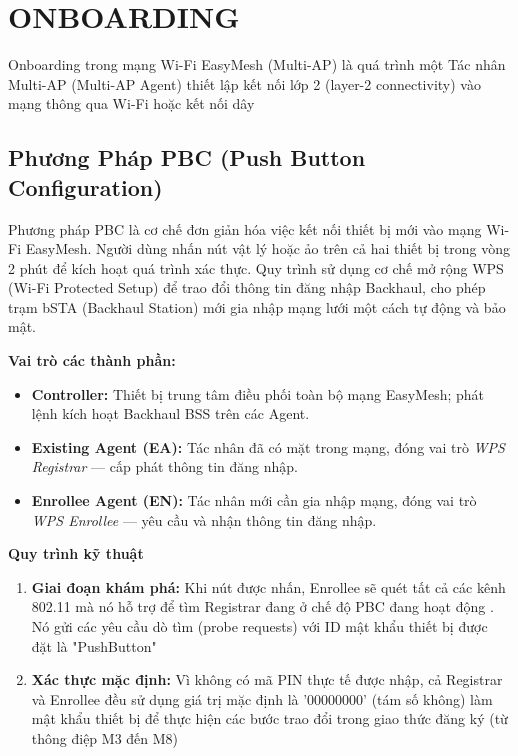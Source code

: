 \chapter{ONBOARDING}
\label{chapter:chapter-3}

Onboarding trong mạng Wi-Fi EasyMesh (Multi-AP) là quá trình một Tác nhân Multi-AP (Multi-AP Agent) thiết lập kết nối lớp 2 (layer-2 connectivity) vào mạng thông qua Wi-Fi hoặc kết nối dây

\section{Phương Pháp PBC (Push Button Configuration)}

Phương pháp PBC là cơ chế đơn giản hóa việc kết nối thiết bị mới vào mạng Wi-Fi EasyMesh.
Người dùng nhấn nút vật lý hoặc ảo trên cả hai thiết bị trong vòng 2 phút để kích hoạt
quá trình xác thực. Quy trình sử dụng cơ chế mở rộng WPS (Wi-Fi Protected Setup) để trao
đổi thông tin đăng nhập Backhaul, cho phép trạm bSTA (Backhaul Station) mới gia nhập
mạng lưới một cách tự động và bảo mật.

\textbf{Vai trò các thành phần:}
\begin{itemize}
	\item \textbf{Controller:} Thiết bị trung tâm điều phối toàn bộ mạng EasyMesh; phát
	lệnh kích hoạt Backhaul BSS trên các Agent.
	\item \textbf{Existing Agent (EA):} Tác nhân đã có mặt trong mạng, đóng vai trò
	\textit{WPS Registrar} --- cấp phát thông tin đăng nhập.
	\item \textbf{Enrollee Agent (EN):} Tác nhân mới cần gia nhập mạng, đóng vai trò
	\textit{WPS Enrollee} --- yêu cầu và nhận thông tin đăng nhập.
\end{itemize}

\textbf{Quy trình kỹ thuật}
\begin{enumerate}
	\item \textbf{Giai đoạn khám phá: } Khi nút được nhấn, Enrollee sẽ quét tất cả các kênh 802.11 mà nó hỗ trợ để tìm Registrar đang ở chế độ PBC đang hoạt động
	. Nó gửi các yêu cầu dò tìm (probe requests) với ID mật khẩu thiết bị được đặt là "PushButton"
	\item \textbf{Xác thực mặc định: } Vì không có mã PIN thực tế được nhập, cả Registrar và Enrollee đều sử dụng giá trị mặc định là '00000000' (tám số không) làm mật khẩu thiết bị để thực hiện các bước trao đổi trong giao thức đăng ký (từ thông điệp M3 đến M8)
\end{enumerate}

